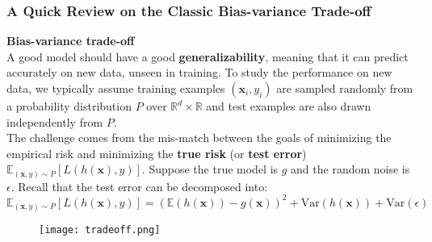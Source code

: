 \documentclass{beamer}
\begin{document}
	\begin{frame}[t]
		\frametitle{A Quick Review on the Classic Bias-variance Trade-off}
		\scriptsize
		\textbf{\small Bias-variance trade-off}\\
		
		\vspace{2mm}
		A good model should have a good \textbf{generalizability}, meaning that it can predict accurately on new data, unseen in training. To study the performance on new data, we typically assume training examples $(\mathbf{x}_i, y_i)$ are sampled randomly from a probability distribution $P$ over $\mathbb{R}^d \times \mathbb{R}$ and test examples are also drawn independently from $P$.\\
		
		\vspace{1mm}
		The challenge comes from the mis-match between the goals of minimizing the empirical risk and minimizing the \textbf{true risk} (or \textbf{test error}) $\mathbb{E}_{(\mathbf{x}, y)\sim P}[L(h(\mathbf{x}), y)]$. Suppose the true model is $g$ and the random noise is $\epsilon$. Recall that the test error can be decomposed into:
		\begin{equation}
			\mathbb{E}_{(\mathbf{x}, y)\sim P}[L(h(\mathbf{x}), y)] = (\mathbb{E}(h(\mathbf{x})) - g(\mathbf{x}))^2 + \text{Var}(h(\mathbf{x})) + \text{Var}(\epsilon)
			\label{eq:1}
		\end{equation}
		
		\vspace{-2mm}
		\begin{figure}[H]
			\centering
			\texttt{[image: tradeoff.png]}
			\vspace*{-1mm}
			\label{fig:2}
		\end{figure}
	\end{frame}
	
\end{document}
